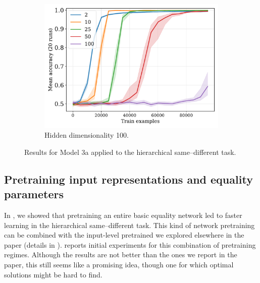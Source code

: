\begin{figure}[H]
  \begin{subfigure}{0.45\linewidth}
    \includegraphics[width=1\textwidth]{../fig/flatpremack-h2-train_size-embed_dim-hidden_dim=100.pdf}
    \caption{Hidden dimensionality 100.}
    \label{fig:model3a-rep}
  \end{subfigure}
  \caption{Results for Model 3a applied to the hierarchical same--different task.}
  \label{fig:model3a}
\end{figure}

\newpage

\subsection{Pretraining input representations and equality parameters}\label{app:double-pretrain}

In , we showed that pretraining an entire basic equality network led to faster learning in the hierarchical same--different task. This kind of network pretraining can be combined with the input-level pretrained we explored elsewhere in the paper (details in ).  reports initial experiments for this combination of pretraining regimes. Although the results are not better than the ones we report in the paper, this still seems like a promising idea, though one for which optimal solutions might be hard to find.

